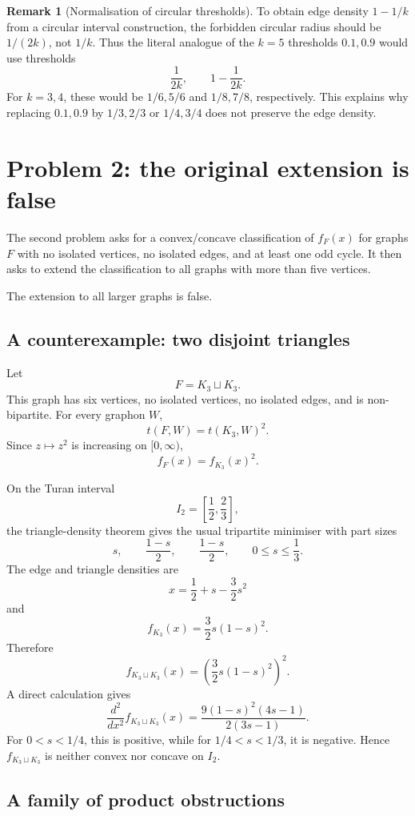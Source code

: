 \documentclass[11pt]{amsart}
\theoremstyle{definition}
\newtheorem{remark}[theorem]{Remark}
\newcommand{\1}{\mathbf 1}
\begin{document}
\begin{remark}[Normalisation of circular thresholds]
To obtain edge density $1-1/k$ from a circular interval construction, the forbidden circular radius should be $1/(2k)$, not $1/k$.  Thus the literal analogue of the $k=5$ thresholds $0.1,0.9$ would use thresholds
\[
   \frac1{2k},\qquad 1-\frac1{2k}.
\]
For $k=3,4$, these would be $1/6,5/6$ and $1/8,7/8$, respectively.  This explains why replacing $0.1,0.9$ by $1/3,2/3$ or $1/4,3/4$ does not preserve the edge density.
\end{remark}

\section{Problem 2: the original extension is false}

The second problem asks for a convex/concave classification of $f_F(x)$ for graphs $F$ with no isolated vertices, no isolated edges, and at least one odd cycle.  It then asks to extend the classification to all graphs with more than five vertices.

The extension to all larger graphs is false.

\subsection{A counterexample: two disjoint triangles}

Let
\[
   F=K_3\sqcup K_3.
\]
This graph has six vertices, no isolated vertices, no isolated edges, and is non-bipartite.  For every graphon $W$,
\[
   t(F,W)=t(K_3,W)^2.
\]
Since $z\mapsto z^2$ is increasing on $[0,\infty)$,
\[
   f_F(x)=f_{K_3}(x)^2.
\]

On the Turan interval
\[
   I_2=\left[\frac12,\frac23\right],
\]
the triangle-density theorem gives the usual tripartite minimiser with part sizes
\[
   s,\qquad \frac{1-s}{2},\qquad \frac{1-s}{2},
   \qquad 0\le s\le \frac13.
\]
The edge and triangle densities are
\[
   x=\frac12+s-\frac32s^2
\]
and
\[
   f_{K_3}(x)=\frac32s(1-s)^2.
\]
Therefore
\[
   f_{K_3\sqcup K_3}(x)=\left(\frac32s(1-s)^2\right)^2.
\]
A direct calculation gives
\[
   \frac{d^2}{dx^2}f_{K_3\sqcup K_3}(x)
   =\frac{9(1-s)^2(4s-1)}{2(3s-1)}.
\]
For $0<s<1/4$, this is positive, while for $1/4<s<1/3$, it is negative.  Hence $f_{K_3\sqcup K_3}$ is neither convex nor concave on $I_2$.

\subsection{A family of product obstructions}
\end{document}
